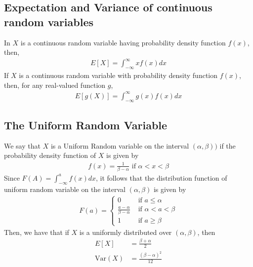 \documentclass[a4paper]{article}
\begin{document}
\subsection{Expectation and Variance of continuous random variables} %
\label{sub:Expectation and Variance of continuous random variables}
In $X$ is a continuous random variable having probability density function $f(x)$, then,
\begin{align}
  E[X] = \int_{-\infty}^\infty xf(x) dx
\end{align}
If $X$ is a continuous random variable with probability density function $f(x)$, then, for any real-valued function $g$,
\begin{align}
  E[g(X)] = \int_{-\infty}^\infty g(x)f(x)dx
\end{align}

\subsection{The Uniform Random Variable} %
\label{sub:The Uniform Random Variable}
We say that $X$ is a Uniform Random variable on the interval $(\alpha,\beta))$ if the probability density function of $X$ is given by
\begin{align}
  f(x) = \frac{1}{\beta-\alpha} \text{ if } \alpha < x < \beta
\end{align}
Since $F(A)=\int_{-\infty}^{a}f(x)dx$, it follows that the distribution function of uniform random variable on the interval $(\alpha,\beta)$ is given by
\begin{align}
  F(a)=
  \begin{cases}
    0  & \text{ if } a \leq \alpha \\
    \frac{a -\alpha}{\beta-\alpha}  &\text{ if } \alpha < a < \beta \\
    1 &\text{ if } a \geq \beta
  \end{cases}
\end{align}
Then, we have that if $X$ is a uniformly distributed over $(\alpha,\beta)$, then
\begin{align}
  E[X] & = \frac{\beta+\alpha}{2} \\
  \text{Var}(X)  & = \frac{(\beta-\alpha)^2}{12} 
\end{align}
\end{document}
